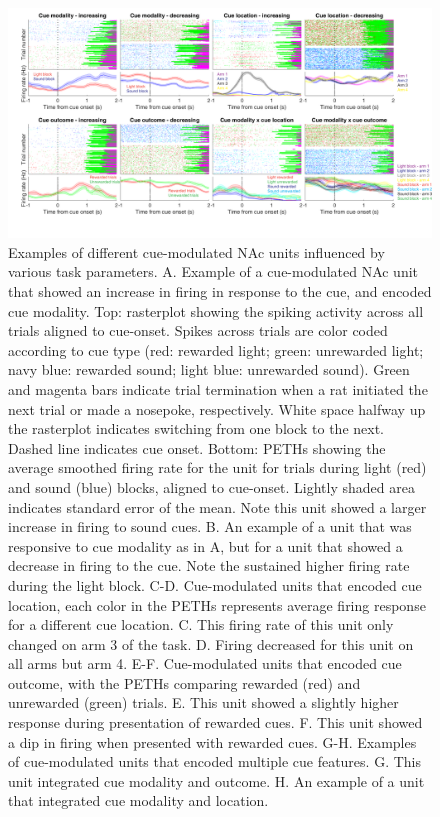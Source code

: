 \documentclass[11pt]{article}
\begin{document}
\begin{figure}[h]
\centering
\includegraphics[width=\textwidth]{Fig 5 - Neural examples.png}
\caption{Examples of different cue-modulated NAc units influenced by various task parameters. A. Example of a cue-modulated NAc unit that showed an increase in firing in response to the cue, and encoded cue modality. Top: rasterplot showing the spiking activity across all trials aligned to cue-onset. Spikes across trials are color coded according to cue type (red: rewarded light; green: unrewarded light; navy blue: rewarded sound; light blue: unrewarded sound). Green and magenta bars indicate trial termination when a rat initiated the next trial or made a nosepoke, respectively. White space halfway up the rasterplot indicates switching from one block to the next. Dashed line indicates cue onset. Bottom: PETHs showing the average smoothed firing rate for the unit for trials during light (red) and sound (blue) blocks, aligned to cue-onset. Lightly shaded area indicates standard error of the mean. Note this unit showed a larger increase in firing to sound cues. B. An example of a unit that was responsive to cue modality as in A, but for a unit that showed a decrease in firing to the cue. Note the sustained higher firing rate during the light block. C-D. Cue-modulated units that encoded cue location, each color in the PETHs represents average firing response for a different cue location. C. This firing rate of this unit only changed on arm 3 of the task. D. Firing decreased for this unit on all arms but arm 4. E-F. Cue-modulated units that encoded cue outcome, with the PETHs comparing rewarded (red) and unrewarded (green) trials. E. This unit showed a slightly higher response during presentation of rewarded cues. F. This unit showed a dip in firing when presented with rewarded cues. G-H. Examples of cue-modulated units that encoded multiple cue features. G. This unit integrated cue modality and outcome. H. An example of a unit that integrated cue modality and location.}
\label{fig:examples}
\end{figure}
\end{document}
